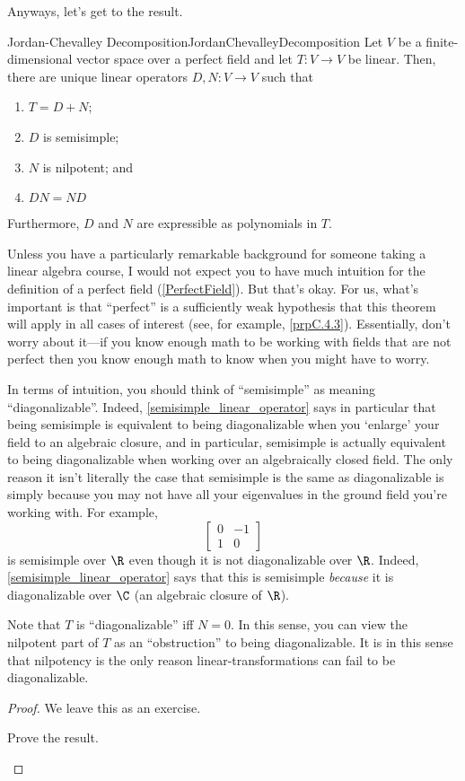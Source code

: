 Anyways, let's get to the result.
\begin{thm}{Jordan-Chevalley Decomposition}{JordanChevalleyDecomposition}
	Let $V$ be a finite-dimensional vector space over a perfect field and let $T\colon V\rightarrow V$ be linear.  Then, there are unique linear operators $D,N\colon V\rightarrow V$ such that
	\begin{enumerate}
		\item $T=D+N$;
		\item $D$ is semisimple;
		\item $N$ is nilpotent; and
		\item $DN=ND$
	\end{enumerate}
	Furthermore, $D$ and $N$ are expressible as polynomials in $T$.
	\begin{rmk}
		Unless you have a particularly remarkable background for someone taking a linear algebra course, I would not expect you to have much intuition for the definition of a perfect field (\cref{PerfectField}).  But that's okay.  For us, what's important is that ``perfect'' is a sufficiently weak hypothesis that this theorem will apply in all cases of interest (see, for example, \cref{prpC.4.3}).  Essentially, don't worry about it---if you know enough math to be working with fields that are not perfect then you know enough math to know when you might have to worry.
	\end{rmk}
	\begin{rmk}
		In terms of intuition, you should think of ``semisimple'' as meaning ``diagonalizable''.  Indeed, \cref{semisimple_linear_operator} says in particular that being semisimple is equivalent to being diagonalizable when you `enlarge' your field to an algebraic closure, and in particular, semisimple is actually equivalent to being diagonalizable when working over an algebraically closed field.  The only reason it isn't literally the case that semisimple is the same as diagonalizable is simply because you may not have all your eigenvalues in the ground field you're working with.  For example,
		\begin{equation}
			\begin{bmatrix}0 & -1 \\ 1 & 0\end{bmatrix}
		\end{equation}
		is semisimple over $\R$ even though it is not diagonalizable over $\R$.  Indeed, \cref{semisimple_linear_operator} says that this is semisimple \emph{because} it is diagonalizable over $\C$ (an algebraic closure of $\R$).
	\end{rmk}
	\begin{rmk}
		Note that $T$ is ``diagonalizable'' iff $N=0$.  In this sense, you can view the nilpotent part of $T$ as an ``obstruction'' to being diagonalizable.  It is in this sense that nilpotency is the only reason linear-transformations can fail to be diagonalizable.
	\end{rmk}
	\begin{proof}
		We leave this as an exercise.
		\begin{exr}[breakable=false]{}{}
			Prove the result.
		\end{exr}
	\end{proof}
\end{thm}
